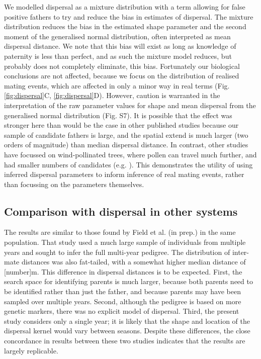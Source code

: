 \documentclass[10pt, a4paper, twocolumn]{article} %
\begin{document}
We modelled dispersal as a mixture distribution with a term allowing for false positive fathers to try and reduce the bias in estimates of dispersal.
The mixture distribution reduces the bias in the estimated shape parameter and the second moment of the generalised normal distribution, often interpreted as mean dispersal distance.
We note that this bias will exist as long as knowledge of paternity is less than perfect, and as such the mixture model reduces, but probably does not completely eliminate, this bias. 
Fortunately our biological conclusions are not affected, because we focus on the distribution of realised mating events, which are affected in only a minor way in real terms (Fig. \ref{fig:dispersal}C, \ref{fig:dispersal}D).
However, caution is warranted in the interpretation of the raw parameter values for shape and mean dispersal from the generalised normal distribution (Fig. S7).
It is possible that the effect was stronger here than would be the case in other published studies because our sample of candidate fathers is large, and the spatial extend is much larger (two orders of magnitude) than median dispersal distance.
In contrast, other studies have focussed on wind-pollinated trees, where pollen can travel much further, and had smaller numbers of candidates (e.g. \cite{adams1992using, austerlitz2004using, klein2008pollen}).
This demonstrates the utility of using inferred dispersal parameters to inform inference of real mating events, rather than focussing on the parameters themselves.

\subsection{Comparison with dispersal in other systems}

The results are similar to those found by Field et al. (in prep.) in the same population.
That study used a much large sample of individuals from multiple years and sought to infer the full multi-year pedigree.
The distribution of inter-mate distances was also fat-tailed, with a somewhat higher median distance of [number]m.
This difference in dispersal distances is to be expected.
First, the search space for identifying parents is much larger, because both parents need to be identified rather than just the father, and because parents may have been sampled over multiple years.
Second, although the pedigree is based on more genetic markers, there was no explicit model of dispersal.
Third, the present study considers only a single year; it is likely that the shape and location of the dispersal kernel would vary between seasons.
Despite these differences, the close concordance in results between these two studies indicates that the results are largely replicable.
\end{document}
